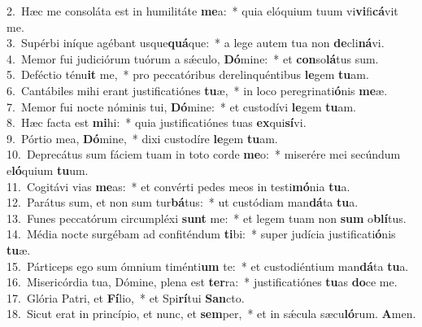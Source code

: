 {2.~}Hæc me consoláta est in humilitáte \textbf{me}a:~* quia elóquium tuum vi\textbf{vi}fi\textbf{cá}vit me.\\
{3.~}Supérbi iníque agébant usque\textbf{quá}que:~* a lege autem tua non \textbf{de}cli\textbf{ná}vi.\\
{4.~}Memor fui judiciórum tuórum a sǽculo, \textbf{Dó}mine:~* et \textbf{con}so\textbf{lá}tus sum.\\
{5.~}Deféctio ténu\textbf{it} me,~* pro peccatóribus derelinquéntibus \textbf{le}gem \textbf{tu}am.\\
{6.~}Cantábiles mihi erant justificatiónes \textbf{tu}æ,~* in loco peregrinati\textbf{ó}nis \textbf{me}æ.\\
{7.~}Memor fui nocte nóminis tui, \textbf{Dó}mine:~* et custodívi \textbf{le}gem \textbf{tu}am.\\
{8.~}Hæc facta est \textbf{mi}hi:~* quia justificatiónes tuas \textbf{ex}qui\textbf{sí}vi.\\
{9.~}Pórtio mea, \textbf{Dó}mine,~* dixi custodíre \textbf{le}gem \textbf{tu}am.\\
{10.~}Deprecátus sum fáciem tuam in toto corde \textbf{me}o:~* miserére mei secúndum e\textbf{ló}quium \textbf{tu}um.\\
{11.~}Cogitávi vias \textbf{me}as:~* et convérti pedes meos in testi\textbf{mó}nia \textbf{tu}a.\\
{12.~}Parátus sum, et non sum tur\textbf{bá}tus:~* ut custódiam man\textbf{dá}ta \textbf{tu}a.\\
{13.~}Funes peccatórum circumpléxi \textbf{sunt} me:~* et legem tuam non \textbf{sum} o\textbf{blí}tus.\\
{14.~}Média nocte surgébam ad confiténdum \textbf{ti}bi:~* super judícia justificati\textbf{ó}nis \textbf{tu}æ.\\
{15.~}Párticeps ego sum ómnium timénti\textbf{um} te:~* et custodiéntium man\textbf{dá}ta \textbf{tu}a.\\
{16.~}Misericórdia tua, Dómine, plena est \textbf{ter}ra:~* justificatiónes \textbf{tu}as \textbf{do}ce me.\\
{17.~}Glória Patri, et \textbf{Fí}lio,~* et Spi\textbf{rí}tui \textbf{San}cto.\\
{18.~}Sicut erat in princípio, et nunc, et \textbf{sem}per,~* et in sǽcula sæcu\textbf{ló}rum. \textbf{A}men.\\
